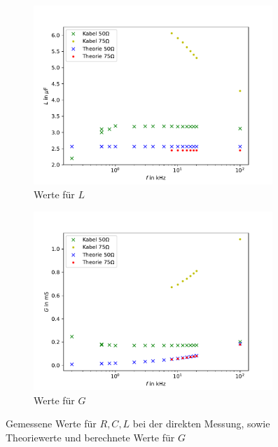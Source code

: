 \begin{figure}[h]
\begin{subfigure}{0.495\textwidth}
		\includegraphics[width=0.99\textwidth]{RLC_DirekteMessung/build/PlotL.pdf}
		\caption{Werte für $L$}
		\label{fig:PlotL}
	\end{subfigure}
	\begin{subfigure}{0.495\textwidth}
		\centering
		\includegraphics[width=0.99\textwidth]{RLC_DirekteMessung/build/PlotG.pdf}
		\caption{Werte für $G$}
		\label{fig:PlotG}
	\end{subfigure}
	\caption[Werte bei der direkten Messung]{Gemessene Werte für $R,C,L$ bei der direkten Messung, sowie Theoriewerte und berechnete Werte für $G$}
	\label{fig:PlotRLCG}
\end{figure}